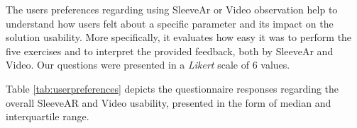 \begin{table}[!t]
\centering
{}
\caption{Questionnaire results}
\label{tab:userpreferences}
\end{table}


The users preferences regarding using SleeveAr or Video observation help to understand how users felt about a specific parameter and its impact on the solution usability. 
More specifically, it evaluates how easy it was to perform the five exercises and to interpret the provided feedback, both by SleeveAr and Video.
Our questions were presented in a \textit{Likert} scale of 6 values.

Table \ref{tab:userpreferences} depicts the questionnaire responses regarding the overall SleeveAR and Video usability, presented in the form of median and interquartile range. 

